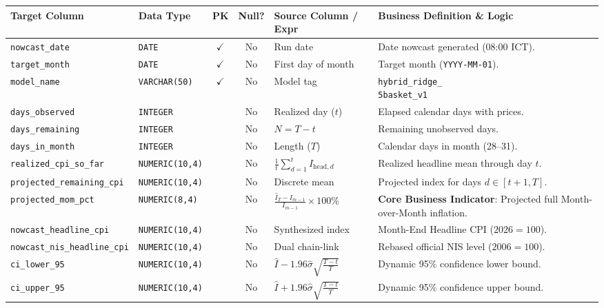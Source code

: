 \documentclass[a4paper, 11pt]{article}
\begin{document}
\begin{table}[H]
\centering
\small
\setlength{\tabcolsep}{4pt}
\begin{tabularx}{\textwidth}{@{}l p{2.4cm} c c >{\raggedright\arraybackslash}p{4.0cm} >{\raggedright\arraybackslash}X@{}}
\toprule
\textbf{Target Column} & \textbf{Data Type} & \textbf{PK} & \textbf{Null?} & \textbf{Source Column / Expr} & \textbf{Business Definition \& Logic} \\
\midrule
\texttt{nowcast\_date} & \texttt{DATE} & $\checkmark$ & No & Run date & Date nowcast generated (08:00 ICT). \\
\texttt{target\_month} & \texttt{DATE} & $\checkmark$ & No & First day of month & Target month (\texttt{YYYY-MM-01}). \\
\texttt{model\_name} & \texttt{VARCHAR(50)} & $\checkmark$ & No & Model tag & \makecell[l]{\texttt{hybrid\_ridge\_}\\\texttt{5basket\_v1}} \\
\texttt{days\_observed} & \texttt{INTEGER} & & No & Realized day ($t$) & Elapsed calendar days with prices. \\
\texttt{days\_remaining} & \texttt{INTEGER} & & No & $N = T - t$ & Remaining unobserved days. \\
\texttt{days\_in\_month} & \texttt{INTEGER} & & No & Length ($T$) & Calendar days in month (28--31). \\
\texttt{realized\_cpi\_so\_far} & \texttt{NUMERIC(10,4)} & & No & $\frac{1}{t}\sum_{d=1}^t I_{\text{head}, d}$ & Realized headline mean through day $t$. \\
\texttt{projected\_remaining\_cpi} & \texttt{NUMERIC(10,4)} & & No & Discrete mean & Projected index for days $d \in [t+1, T]$. \\
\texttt{projected\_mom\_pct} & \texttt{NUMERIC(8,4)} & & No & $\frac{\hat{I}_T - I_{m-1}}{I_{m-1}} \times 100\%$ & \textbf{Core Business Indicator}: Projected full Month-over-Month inflation. \\
\texttt{nowcast\_headline\_cpi} & \texttt{NUMERIC(10,4)} & & No & Synthesized index & Month-End Headline CPI ($2026=100$). \\
\texttt{nowcast\_nis\_headline\_cpi} & \texttt{NUMERIC(10,4)} & & No & Dual chain-link & Rebased official NIS level ($2006=100$). \\
\texttt{ci\_lower\_95} & \texttt{NUMERIC(10,4)} & & No & $\hat{I} - 1.96 \hat{\sigma}\sqrt{\frac{T-t}{T}}$ & Dynamic 95\% confidence lower bound. \\
\texttt{ci\_upper\_95} & \texttt{NUMERIC(10,4)} & & No & $\hat{I} + 1.96 \hat{\sigma}\sqrt{\frac{T-t}{T}}$ & Dynamic 95\% confidence upper bound. \\

\end{tabularx}
\end{table}
\end{document}
